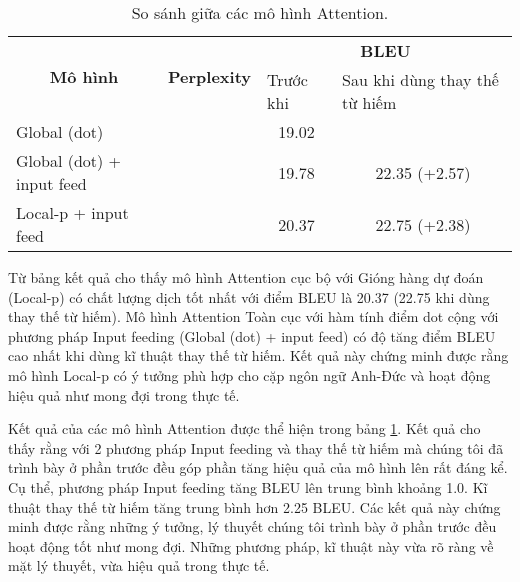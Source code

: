 \begin{table}
	\centering
	\begin{tabular}{|l|l|c|c|} 
		\hline
		\multicolumn{1}{|c|}{\multirow{2}{*}{\textbf{Mô hình} }} & \multicolumn{1}{c|}{\multirow{2}{*}{\textbf{Perplexity} }} & \multicolumn{2}{c|}{\textbf{BLEU}}                                                   \\ 
		\cline{3-4}
		\multicolumn{1}{|c|}{}                                   & \multicolumn{1}{c|}{}                                      & \multicolumn{1}{l|}{Trước khi} & \multicolumn{1}{l|}{Sau khi dùng thay thế từ hiếm}  \\ 
		\hline
		Global (dot)                                             &                                                            & 19.02                          &                                                     \\ 
		\hline
		Global (dot) + input feed                                &                                                            & 19.78                          & 22.35 (+2.57)                                              \\ 
		\hline
		Local-p + input feed                                     &                                                            & 20.37                          & 22.75 (+2.38)                                               \\
		\hline
	\end{tabular}
	\caption{So sánh giữa các mô hình Attention.}
	\label{tab_attn_vs_attn}
\end{table}
Từ bảng kết quả cho thấy mô hình Attention cục bộ với Gióng hàng dự đoán (Local-p) có chất lượng dịch tốt nhất với điểm BLEU là 20.37 (22.75 khi dùng thay thế từ hiếm). Mô hình Attention Toàn cục với hàm tính điểm dot cộng với phương pháp Input feeding (Global (dot) + input feed) có độ tăng điểm BLEU cao nhất khi dùng kĩ thuật thay thế từ hiếm. Kết quả này chứng minh được rằng mô hình Local-p có ý tưởng phù hợp cho cặp ngôn ngữ Anh-Đức và hoạt động hiệu quả như mong đợi trong thực tế. 
 
Kết quả của các mô hình Attention được thể hiện trong bảng \ref{tab_attn_vs_attn}. Kết quả cho thấy rằng với 2 phương pháp Input feeding và thay thế từ hiếm mà chúng tôi đã trình bày ở phần trước đều góp phần tăng hiệu quả của mô hình lên rất đáng kể. Cụ thể, phương pháp Input feeding tăng BLEU lên trung bình khoảng 1.0. Kĩ thuật thay thế từ hiếm tăng trung bình hơn 2.25 BLEU. Các kết quả này chứng minh được rằng những ý tưởng, lý thuyết chúng tôi trình bày ở phần trước đều hoạt động tốt như mong đợi. Những phương pháp, kĩ thuật này vừa rõ ràng về mặt lý thuyết, vừa hiệu quả trong thực tế.

